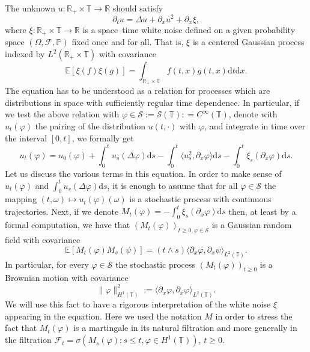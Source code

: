 \documentclass[a4paper,11pt]{article}
\newcommand{\assign}{:=}
\newcommand{\mathd}{\mathrm{d}}
\newcommand{\CS}{\mathscr{S}}
\begin{document}
 The unknown $u :
\mathbb{R}_+ \times \mathbb{T} \rightarrow \mathbb{R}$ should satisfy
\[ \partial_t u = \Delta u + \partial_x u^2 + \partial_x \xi, \]
where $\xi : \mathbb{R}_+ \times \mathbb{T} \rightarrow \mathbb{R}$ is a
space--time white noise defined on a given probability space $(\Omega,
\mathcal{F}, \mathbb{P})$ fixed once and for all. That is, $\xi$ is a
centered Gaussian process indexed by $L^2 (\mathbb{R}_+ \times \mathbb{T})$
with covariance
\[ \mathbb{E} [\xi (f) \xi (g)] = \int_{\mathbb{R}_+ \times \mathbb{T}} f
   (t, x) g (t, x) \mathd t \mathd x. \]
The equation has to be understood as a relation for processes which are
distributions in space with sufficiently regular time dependence. In particular, if we test the above
relation with $\varphi \in \CS \assign \CS (\mathbb{T}) : = C^{\infty}
(\mathbb{T})$, denote with $u_t (\varphi)$ the pairing of the distribution $u
(t, \cdot)$ with $\varphi$, and integrate in time over the interval $[0, t]$,
we formally get
\[ u_t (\varphi) = u_0 (\varphi) + \int_0^t u_s (\Delta \varphi) \mathd s -
   \int_0^t \langle u^2_s, \partial_x \varphi \rangle \mathd s - \int_0^t
   \xi_s (\partial_x \varphi) \mathd s. \]
Let us discuss the various terms in this equation. In order to make sense of
$u_t (\varphi)$ and $\int_0^t u_s (\Delta \varphi) \mathd s$, it is enough to
assume that for all $\varphi \in \CS$ the mapping $(t, \omega) \mapsto u_t
(\varphi) (\omega)$ is a stochastic process with continuous trajectories.
Next, if we denote $M_t (\varphi) = -\int_0^t \xi_s (\partial_x \varphi) \mathd
s$ then, at least by a formal computation, we have that $(M_t (\varphi))_{t
\geqslant 0, \varphi \in \CS}$ is a Gaussian random field with covariance
\[ \mathbb{E} [M_t (\varphi) M_s (\psi)] = (t \wedge s) \langle \partial_x
   \varphi, \partial_x \psi \rangle_{L^2 (\mathbb{T})} . \]
In particular, for every $\varphi \in \CS$ the stochastic process $(M_t
(\varphi))_{t \geqslant 0}$ is a Brownian motion with covariance
\[ \| \varphi \|_{H^1 (\mathbb{T})}^2 \assign \langle \partial_x \varphi,
   \partial_x \varphi \rangle_{L^2 (\mathbb{T})} . \]
   We will use this fact to have a rigorous interpretation of the white noise $\xi$ appearing in the equation.
Here we used the notation $M$ in order to stress the fact that $M_t (\varphi)$
is a martingale in its natural filtration and more generally in the filtration
$\mathcal{F}_t = \sigma (M_s (\varphi) : s \leqslant t, \varphi \in H^1
(\mathbb{T}))$, $t \geqslant 0$.

\
\end{document}
